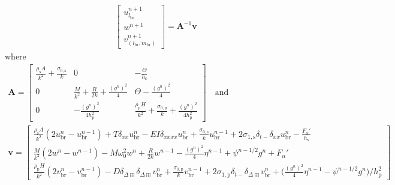 \documentclass{article}
\begin{document}
\begin{align}
\begin{bmatrix}
        u^{n+1}_{l_\text{br}}\\
        w^{n+1}\\
        v^{n+1}_{(l_\text{br}, m_\text{br})}
    \end{bmatrix}
    = 
    \mathbf{A}^{-1}\mathbf{v}
\end{align}
where
\begin{equation}
\begin{gathered}
\mathbf{A} = 
    \begin{bmatrix}
        \frac{\rho_\text{s} A}{k^2} + \frac{\sigma_{0,\text{s}}}{k} & 0 & - \frac{\Theta}{h_\text{s}}\\
        0 & \frac{M}{k^2}+\frac{R}{2k}+\frac{(g^n)^2}{4} &\Theta-\frac{(g^n)^2}{4}\\
        0 & -\frac{(g^n)^2}{4h_\text{p}^2} & \frac{\rho_\text{p}H}{k^2} + \frac{\sigma_{0,\text{p}}}{k} + \frac{(g^n)^2}{4h_\text{p}^2}
    \end{bmatrix}
    \quad \text{and}\\
    \mathbf{v} = 
    \begin{bmatrix}
        \frac{\rho_\text{s} A}{k^2}(2u^n_\text{br}-u_\text{br}^{n-1})+T\delta_{xx}u_\text{br}^n-EI\delta_{xxxx}u_\text{br}^n + \frac{\sigma_{0,\text{s}}}{k}u_\text{br}^{n-1} + 2\sigma_{1,\text{s}}\delta_{t-}\delta_{xx}u_\text{br}^n - \frac{F_\alpha'}{h_\text{s}}\\
        \frac{M}{k^2}(2w^n-w^{n-1})-M\omega_0^2w^n + \frac{R}{2k}w^{n-1}-\frac{(g^n)^2}{4}\eta^{n-1}+\psi^{n-1/2}g^n + F_\alpha'\\
        \frac{\rho_\text{p}H}{k^2}(2v_\text{br}^n-v_\text{br}^{n-1})-D\delta_{\Delta\boxplus}\delta_{\Delta\boxplus}v_\text{br}^n+ \frac{\sigma_{0,\text{p}}}{k}v^{n-1}_\text{br} + 2\sigma_{1,\text{p}}\delta_{t-}\delta_{\Delta\boxplus}v^n_\text{br} + \Big(\frac{(g^n)^2}{4}\eta^{n-1}-\psi^{n-1/2}g^n\Big)/h_\text{p}^2
    \end{bmatrix}
    \nonumber
\end{gathered}
\end{equation}
\end{document}
